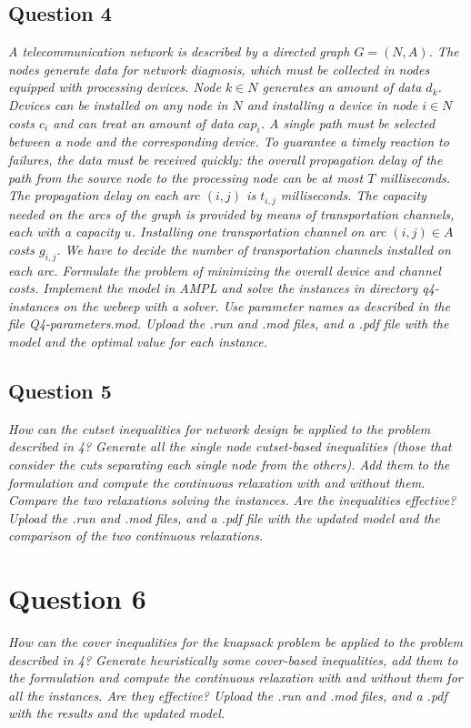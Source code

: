 \documentclass[10pt]{article}
\begin{document}
    \subsection*{Question 4}
    \textit{A telecommunication network is described by a directed graph $G=(N,A)$. The nodes generate data for network diagnosis, which must be collected in nodes equipped with processing devices. Node $k \in N$ generates an amount of data $d_k$. Devices can be installed on any node in $N$ and installing a device in node $i \in N$ costs $c_i$ and can treat an amount of data $cap_i$. A single path must be selected between a node and the corresponding device. To guarantee a timely reaction to failures, the data must be received quickly: the overall propagation delay of the path from the source node to the processing node can be at most $T$ milliseconds. The propagation delay on each arc $(i,j)$ is $t_{i,j}$ milliseconds. The capacity needed on the arcs of the graph is provided by means of transportation channels, each with a capacity $u$. Installing one transportation channel on arc $(i,j) \in A$ costs $g_{i,j}$. We have to decide the number of transportation channels installed on each arc. Formulate the problem of minimizing the overall device and channel costs. Implement the model in AMPL and solve the instances in directory q4-instances on the webeep with a solver. Use parameter names as described in the file Q4-parameters.mod.  Upload the .run and .mod files, and a .pdf file with the model and the optimal value for each instance.}


    \subsection*{Question 5}
    \textit{How can the cutset inequalities for network design be applied to the problem described in 4? Generate all the single node cutset-based inequalities (those that consider the cuts separating each single node from the others). Add them to the formulation and compute the continuous relaxation with and without them. Compare the two relaxations solving the instances. Are the inequalities effective? Upload the .run and .mod files, and a .pdf file with the updated model and the comparison of the two continuous relaxations.}

    \section*{Question 6}
    \textit{How can the cover inequalities for the knapsack problem be applied to the problem described in 4? Generate heuristically some cover-based inequalities, add them to the formulation and compute the continuous relaxation with and without them for all the instances. Are they effective? Upload the .run and .mod files, and a .pdf with the results and the updated model.}
\end{document}
